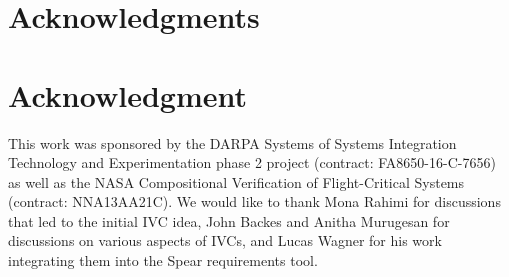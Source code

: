 \documentclass[10pt,journal,compsoc]{IEEEtran}
\begin{document}
%









%




%




\vspace{0.08in}




\ifCLASSOPTIONcompsoc
  \section*{Acknowledgments}
\else
  \section*{Acknowledgment}
\fi

This work was sponsored by the DARPA Systems of Systems Integration Technology and Experimentation phase 2 project (contract: FA8650-16-C-7656) as well as the NASA Compositional Verification of Flight-Critical Systems (contract: NNA13AA21C).  We would like to thank Mona Rahimi for discussions that led to the initial IVC idea, John Backes and Anitha Murugesan for discussions on various aspects of IVCs, and Lucas Wagner for his work integrating them into the Spear requirements tool.
\end{document}
